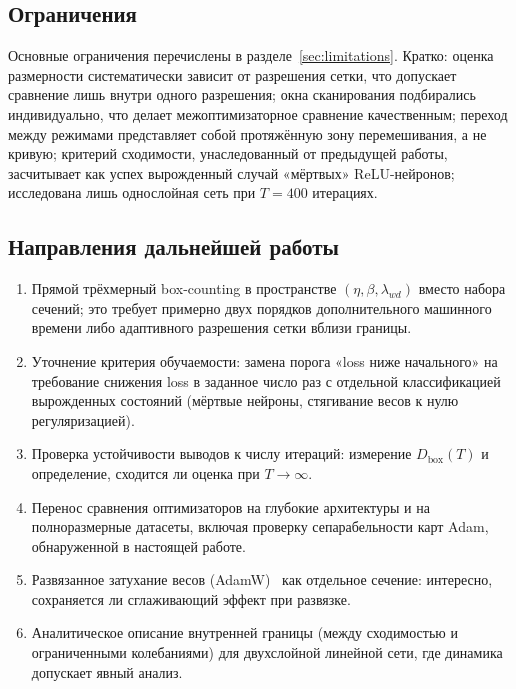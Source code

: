 \subsection{Ограничения}

Основные ограничения перечислены в разделе~\ref{sec:limitations}. Кратко:
оценка размерности систематически зависит от разрешения сетки, что допускает
сравнение лишь внутри одного разрешения; окна сканирования подбирались
индивидуально, что делает межоптимизаторное сравнение качественным; переход
между режимами представляет собой протяжённую зону перемешивания, а не
кривую; критерий сходимости, унаследованный от предыдущей работы, засчитывает
как успех вырожденный случай «мёртвых» ReLU-нейронов; исследована лишь
однослойная сеть при $T=400$ итерациях.

\subsection{Направления дальнейшей работы}

\begin{enumerate}[leftmargin=*,topsep=2pt,itemsep=2pt]
  \item Прямой трёхмерный box-counting в пространстве
        $(\eta,\beta,\lambda_{wd})$ вместо набора сечений; это требует
        примерно двух порядков дополнительного машинного времени либо
        адаптивного разрешения сетки вблизи границы.
  \item Уточнение критерия обучаемости: замена порога «loss ниже начального»
        на требование снижения loss в заданное число раз с отдельной
        классификацией вырожденных состояний (мёртвые нейроны, стягивание
        весов к нулю регуляризацией).
  \item Проверка устойчивости выводов к числу итераций: измерение
        $D_{\mathrm{box}}(T)$ и определение, сходится ли оценка при $T\to\infty$.
  \item Перенос сравнения оптимизаторов на глубокие архитектуры и на
        полноразмерные датасеты, включая проверку сепарабельности карт Adam,
        обнаруженной в настоящей работе.
  \item Развязанное затухание весов (AdamW)~\cite{loshchilov2019} как отдельное
        сечение: интересно, сохраняется ли сглаживающий эффект при развязке.
  \item Аналитическое описание внутренней границы (между сходимостью и
        ограниченными колебаниями) для двухслойной линейной сети, где
        динамика допускает явный анализ.
\end{enumerate}
